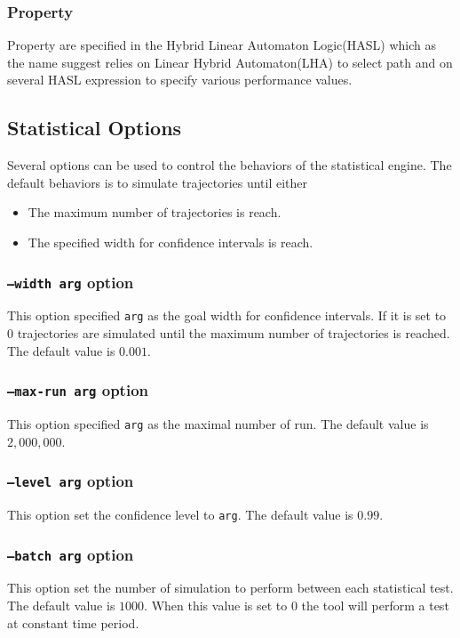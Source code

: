 \documentclass{article}
\begin{document}
\subsubsection{Property}
Property are specified in the Hybrid Linear Automaton Logic(HASL)
which as the name suggest relies on Linear Hybrid Automaton(LHA) to
select path and on several HASL expression to specify various
performance values.


\subsection{Statistical Options}
Several options can be used to control the behaviors of the statistical engine.
The default behaviors is to simulate trajectories until either
\begin{itemize}
\item The maximum number of trajectories is reach.
\item The specified width for confidence intervals is reach.
\end{itemize}

\subsubsection{\texttt{--width arg}  option}
This option specified \texttt{arg} as the goal width for
confidence intervals. If it is set to $0$ trajectories are
simulated until the maximum number of trajectories is reached.
The default value is $0.001$.

\subsubsection{\texttt{--max-run arg}  option}
This option specified \texttt{arg} as the maximal number of run.
The default value is $2,000,000$.

\subsubsection{\texttt{--level arg}  option}
This option set the confidence level to \texttt{arg}.
The default value is $0.99$.

\subsubsection{\texttt{--batch arg}  option}
This option set the number of simulation to perform between each
statistical test.  The default value is $1000$. When this value is 
set to $0$ the tool will perform a test at constant time period.
\end{document}
